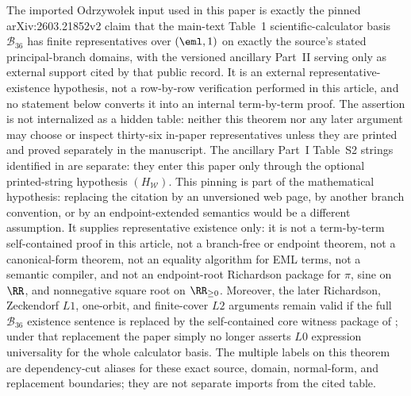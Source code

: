 \begin{theorem}
\label{thm:L0-citation-domain-support}
\label{thm:L0-external-anchor-criterion}
\label{thm:B36-import-exact-scope}
\label{thm:B36-import-normal-form-separation}
\label{cor:external-compiler-isolation}
\label{prop:B36-principal-branch-domain-source}
\label{thm:L0-import-replacement-invariance}
\label{thm:B36-citation-stability-and-domain-cut}
The imported Odrzywo{\l}ek input used in this paper is exactly the pinned
arXiv:2603.21852v2 claim that the main-text Table~1 scientific-calculator basis
\(\mathcal B_{36}\) has finite representatives over \((\eml,1)\) on exactly the
source's stated principal-branch domains, with the versioned ancillary Part~II
serving only as external support cited by that public record.  It is an
external representative-existence hypothesis, not a row-by-row verification
performed in this article, and no statement below converts it into an internal
term-by-term proof.
The assertion is not internalized as a hidden table: neither this theorem nor any
later argument may choose or inspect thirty-six in-paper representatives unless
they are printed and proved separately in the manuscript.
The ancillary Part~I Table~S2 strings identified in  are separate:
they enter this paper only through the optional printed-string hypothesis
\((H_{\mathcal W})\).  This pinning is part of the mathematical hypothesis:
replacing the citation by an unversioned web page, by another branch convention,
or by an endpoint-extended semantics would be a different assumption.  It
supplies representative existence only: it is not a term-by-term
self-contained proof in this article, not a branch-free or endpoint theorem, not
a canonical-form theorem, not an equality algorithm for EML terms, not a
semantic compiler, and not an endpoint-root Richardson package for \(\pi\), sine
on \(\RR\), and nonnegative square root on \(\RR_{\ge0}\).  Moreover, the later
Richardson, Zeckendorf \(L1\), one-orbit, and finite-cover \(L2\) arguments
remain valid if the full \(\mathcal B_{36}\) existence sentence is replaced by
the self-contained core witness package of
; under that replacement the paper simply
no longer asserts \(L0\) expression universality for the whole calculator basis.
The multiple labels on this theorem are dependency-cut aliases for these exact
source, domain, normal-form, and replacement boundaries; they are not separate
imports from the cited table.
\end{theorem}

